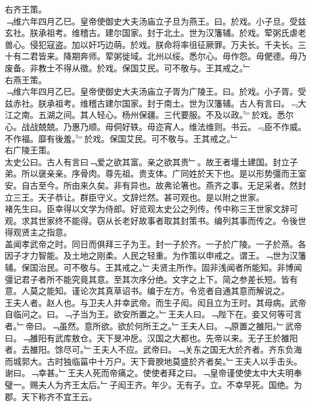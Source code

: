 \documentclass{zhvt-classic}
\begin{document}
\hspace*{2em}右齐王策。\\
\hspace*{2em}﹁维六年四月乙巳。皇帝使御史大夫汤庙立子旦为燕王。曰。於戏。小子旦。受兹玄社。朕承祖考。维稽古。建尔国家。封于北土。世为汉籓辅。於戏。荤粥氏虐老兽心。侵犯寇盗。加以奸巧边萌。於戏。朕命将率徂征厥罪。万夫长。千夫长。三十有二君皆来。降期奔师。荤粥徙域。北州以绥。悉尔心。毋作怨。毋俷德。毋乃废备。非教士不得从徵。於戏。保国艾民。可不敬与。王其戒之。﹂\\
\hspace*{2em}右燕王策。\\
\hspace*{2em}﹁维六年四月乙巳。皇帝使御史大夫汤庙立子胥为广陵王。曰。於戏。小子胥。受兹赤社。朕承祖考。维稽古建尔国家。封于南土。世为汉籓辅。古人有言曰。﹃大江之南。五湖之间。其人轻心。杨州保疆。三代要服。不及以政。﹄於戏。悉尔心。战战兢兢。乃惠乃顺。毋侗好轶。毋迩宵人。维法维则。书云。﹃臣不作威。不作福。靡有後羞。﹄於戏。保国艾民。可不敬与。王其戒之。﹂\\
\hspace*{2em}右广陵王策。\\
\hspace*{2em}太史公曰。古人有言曰﹁爱之欲其富。亲之欲其贵﹂。故王者壃土建国。封立子弟。所以襃亲亲。序骨肉。尊先祖。贵支体。广同姓於天下也。是以形势彊而王室安。自古至今。所由来久矣。非有异也。故弗论箸也。燕齐之事。无足采者。然封立三王。天子恭让。群臣守义。文辞烂然。甚可观也。是以附之世家。\\
\hspace*{2em}褚先生曰。臣幸得以文学为侍郎。好览观太史公之列传。传中称三王世家文辞可观。求其世家终不能得。窃从长老好故事者取其封策书。编列其事而传之。令後世得观贤主之指意。\\
\hspace*{2em}盖闻孝武帝之时。同日而俱拜三子为王。封一子於齐。一子於广陵。一子於燕。各因子才力智能。及土地之刚柔。人民之轻重。为作策以申戒之。谓王。﹁世为汉籓辅。保国治民。可不敬与。王其戒之。﹂夫贤主所作。固非浅闻者所能知。非博闻彊记君子者所不能究竟其意。至其次序分绝。文字之上下。简之参差长短。皆有意。人莫之能知。谨论次其真草诏书。编于左方。令览者自通其意而解说之。\\
\hspace*{2em}王夫人者。赵人也。与卫夫人并幸武帝。而生子闳。闳且立为王时。其母病。武帝自临问之。曰。﹁子当为王。欲安所置之。﹂王夫人曰。﹁陛下在。妾又何等可言者。﹂帝曰。﹁虽然。意所欲。欲於何所王之。﹂王夫人曰。﹁原置之雒阳。﹂武帝曰。﹁雒阳有武库敖仓。天下旻冲戹。汉国之大都也。先帝以来。无子王於雒阳者。去雒阳。馀尽可。﹂王夫人不应。武帝曰。﹁关东之国无大於齐者。齐东负海而城郭大。古时独临菑中十万户。天下膏腴地莫盛於齐者矣。﹂王夫人以手击头。谢曰。﹁幸甚。﹂王夫人死而帝痛之。使使者拜之曰。﹁皇帝谨使使太中大夫明奉璧一。赐夫人为齐王太后。﹂子闳王齐。年少。无有子。立。不幸早死。国绝。为郡。天下称齐不宜王云。\\
\end{document}

